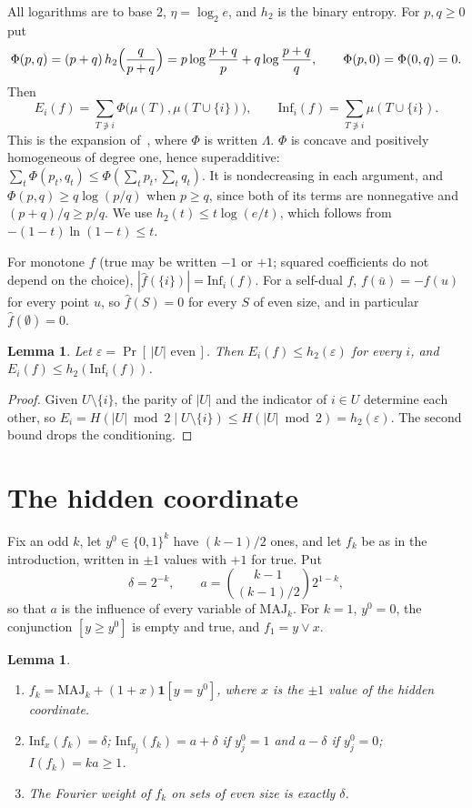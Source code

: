\documentclass[11pt]{amsart}
\newtheorem{lemma}[theorem]{Lemma}
\theoremstyle{remark}
\newcommand{\Inf}{\mathrm{Inf}}
\newcommand{\MAJ}{\mathrm{MAJ}}
\begin{document}
All logarithms are to base $2$, $\eta=\log_2e$, and $h_2$ is the binary entropy. For $p,q\ge0$ put
\[
\Phi(p,q)=(p+q)\,h_2\Bigl(\frac{q}{p+q}\Bigr)=p\log\frac{p+q}{p}+q\log\frac{p+q}{q},\qquad\Phi(p,0)=\Phi(0,q)=0.
\]
Then
\begin{equation}\label{eq:Ei}
E_i(f)=\sum_{T\not\ni i}\Phi\bigl(\mu(T),\mu(T\cup\{i\})\bigr),\qquad \Inf_i(f)=\sum_{T\not\ni i}\mu(T\cup\{i\}).
\end{equation}
This is the expansion of~\cite[Section~4]{Shm3}, where $\Phi$ is written $\Lambda$.
$\Phi$ is concave and positively homogeneous of degree one, hence superadditive:
$\sum_t\Phi(p_t,q_t)\le\Phi(\sum_tp_t,\sum_tq_t)$. It is nondecreasing in each argument, and
$\Phi(p,q)\ge q\log(p/q)$ when $p\ge q$, since both of its terms are nonnegative and $(p+q)/q\ge p/q$. We use
$h_2(t)\le t\log(e/t)$, which follows from $-(1-t)\ln(1-t)\le t$.

For monotone $f$ (true may be written $-1$ or $+1$; squared coefficients do not depend on the choice),
$|\hat f(\{i\})|=\Inf_i(f)$. For a self-dual $f$, $f(\bar u)=-f(u)$ for every point $u$, so $\hat f(S)=0$ for every $S$ of even size, and in particular $\hat f(\emptyset)=0$.

\begin{lemma}\label{lem:parity}
Let $\varepsilon=\Pr[\,|U|\text{ even}\,]$. Then $E_i(f)\le h_2(\varepsilon)$ for every $i$, and $E_i(f)\le
h_2(\Inf_i(f))$.
\end{lemma}

\begin{proof}
Given $U\setminus\{i\}$, the parity of $|U|$ and the indicator of $i\in U$ determine each other, so
$E_i=H(|U|\bmod 2\mid U\setminus\{i\})\le H(|U|\bmod2)=h_2(\varepsilon)$. The second bound drops the conditioning.
\end{proof}

\section{The hidden coordinate}\label{sec:hidden}

Fix an odd $k$, let $y^0\in\{0,1\}^k$ have $(k-1)/2$ ones, and let $f_k$ be as in the introduction, written in $\pm1$
values with $+1$ for true. Put
\[
\delta=2^{-k},\qquad a=\binom{k-1}{(k-1)/2}2^{1-k},
\]
so that $a$ is the influence of every variable of $\MAJ_k$. For $k=1$, $y^0=0$, the conjunction $[y\ge y^0]$ is empty and true, and $f_1=y\vee x$.

\begin{lemma}\label{lem:hidden}
\begin{enumerate}
\item $f_k=\MAJ_k+(1+x)\mathbf 1[y=y^0]$, where $x$ is the $\pm1$ value of the hidden coordinate.
\item $\Inf_x(f_k)=\delta$; $\Inf_{y_j}(f_k)=a+\delta$ if $y^0_j=1$ and $a-\delta$ if $y^0_j=0$; $I(f_k)=ka\ge1$.
\item The Fourier weight of $f_k$ on sets of even size is exactly $\delta$.
\end{enumerate}
\end{lemma}
\end{document}
